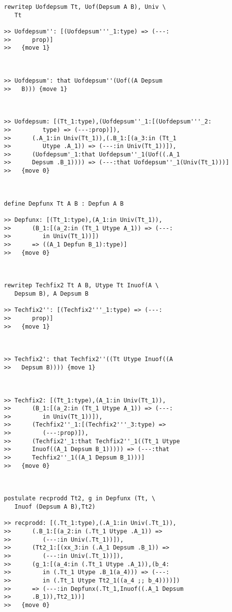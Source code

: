 \documentclass{article}
\begin{document}
\begin{verbatim}
rewritep Uofdepsum Tt, Uof(Depsum A B), Univ \
   Tt

>> Uofdepsum'': [(Uofdepsum'''_1:type) => (---:
>>      prop)]
>>   {move 1}



>> Uofdepsum': that Uofdepsum''(Uof((A Depsum
>>   B))) {move 1}



>> Uofdepsum: [(Tt_1:type),(Uofdepsum''_1:[(Uofdepsum'''_2:
>>         type) => (---:prop)]),
>>      (.A_1:in Univ(Tt_1)),(.B_1:[(a_3:in (Tt_1
>>         Utype .A_1)) => (---:in Univ(Tt_1))]),
>>      (Uofdepsum'_1:that Uofdepsum''_1(Uof((.A_1
>>      Depsum .B_1)))) => (---:that Uofdepsum''_1(Univ(Tt_1)))]
>>   {move 0}



define Depfunx Tt A B : Depfun A B

>> Depfunx: [(Tt_1:type),(A_1:in Univ(Tt_1)),
>>      (B_1:[(a_2:in (Tt_1 Utype A_1)) => (---:
>>         in Univ(Tt_1))])
>>      => ((A_1 Depfun B_1):type)]
>>   {move 0}



rewritep Techfix2 Tt A B, Utype Tt Inuof(A \
   Depsum B), A Depsum B

>> Techfix2'': [(Techfix2'''_1:type) => (---:
>>      prop)]
>>   {move 1}



>> Techfix2': that Techfix2''((Tt Utype Inuof((A
>>   Depsum B)))) {move 1}



>> Techfix2: [(Tt_1:type),(A_1:in Univ(Tt_1)),
>>      (B_1:[(a_2:in (Tt_1 Utype A_1)) => (---:
>>         in Univ(Tt_1))]),
>>      (Techfix2''_1:[(Techfix2'''_3:type) =>
>>         (---:prop)]),
>>      (Techfix2'_1:that Techfix2''_1((Tt_1 Utype
>>      Inuof((A_1 Depsum B_1))))) => (---:that
>>      Techfix2''_1((A_1 Depsum B_1)))]
>>   {move 0}



postulate recprodd Tt2, g in Depfunx (Tt, \
   Inuof (Depsum A B),Tt2)

>> recprodd: [(.Tt_1:type),(.A_1:in Univ(.Tt_1)),
>>      (.B_1:[(a_2:in (.Tt_1 Utype .A_1)) =>
>>         (---:in Univ(.Tt_1))]),
>>      (Tt2_1:[(xx_3:in (.A_1 Depsum .B_1)) =>
>>         (---:in Univ(.Tt_1))]),
>>      (g_1:[(a_4:in (.Tt_1 Utype .A_1)),(b_4:
>>         in (.Tt_1 Utype .B_1(a_4))) => (---:
>>         in (.Tt_1 Utype Tt2_1((a_4 ;; b_4))))])
>>      => (---:in Depfunx(.Tt_1,Inuof((.A_1 Depsum
>>      .B_1)),Tt2_1))]
>>   {move 0}


\end{verbatim}
\end{document}
